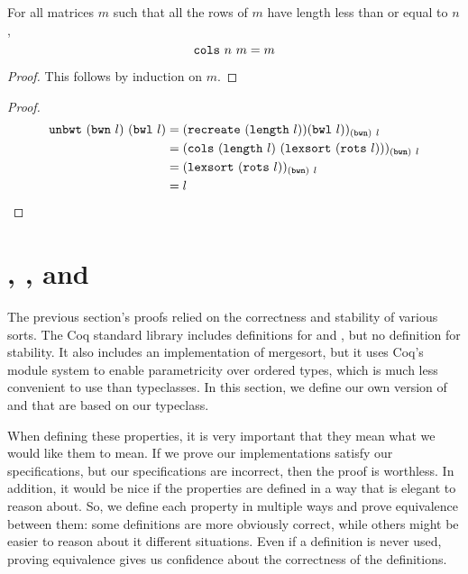 \documentclass[sigplan,10pt,anonymous,review]{thesis}
\begin{document}
\begin{theorem}[cols\_id]
  For all matrices $m$ such that all the rows of $m$ have length less
  than or equal to $n$,
  \begin{equation*}
    \texttt{\textup{cols}}~n~m = m
  \end{equation*}
\end{theorem}
\begin{proof}
  This follows by induction on $m$.
\end{proof}

\unbwtcorrect
\begin{proof}
\begin{align*}
     \texttt{\textup{unbwt}}~(\texttt{\textup{bwn}}~l)~(\texttt{\textup{bwl}}~l)
  &= (\texttt{\textup{recreate}}~(\texttt{\textup{length}}~l))(\texttt{\textup{bwl}}~l))_{(\texttt{\textup{bwn}})~l}\\
  &= (\texttt{\textup{cols}}~(\texttt{\textup{length}}~l)~(\texttt{\textup{lexsort}}~(\texttt{\textup{rots}}~l)))_{(\texttt{\textup{bwn}})~l} \\
  &= (\texttt{\textup{lexsort}}~(\texttt{\textup{rots}}~l))_{(\texttt{\textup{bwn}})~l} \\
  &= l \qedhere
\end{align*}
\end{proof}

\section{, , and }
\label{sec:sorted_perm_stable}

The previous section's proofs relied on the correctness and stability
of various sorts. The Coq standard library includes definitions for
 and , but no definition for stability.
It also includes an implementation of mergesort, but it uses Coq's
module system to enable parametricity over ordered types, which is
much less convenient to use than typeclasses. In this section, we
define our own version of  and  that are
based on our  typeclass.

When defining these properties, it is very important that they mean
what we would like them to mean. If we prove our implementations
satisfy our specifications, but our specifications are incorrect, then
the proof is worthless. In addition, it would be nice if the
properties are defined in a way that is elegant to reason about. So,
we define each property in multiple ways and prove equivalence between
them: some definitions are more obviously correct, while others might
be easier to reason about it different situations. Even if a
definition is never used, proving equivalence gives us confidence
about the correctness of the definitions.
\end{document}
